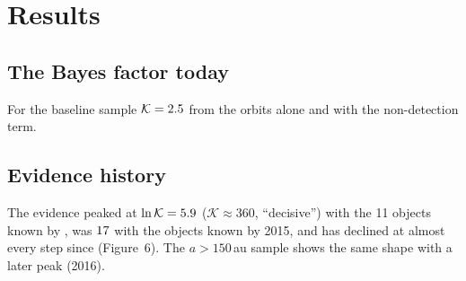 \documentclass[twocolumn,linenumbers]{aastex631}
\newcommand{\Kbf}{\mathcal{K}}
\begin{document}
\section{Results}\label{sec:results}

\subsection{The Bayes factor today}\label{sec:bf}
For the baseline sample $\Kbf=\KbbOrbits$ from the orbits alone and \KbbNondet{} with the non-detection term.

\subsection{Evidence history}\label{sec:history}
The evidence peaked at $\ln\Kbf=\lnKpeak$ ($\Kbf\approx360$, ``decisive'') with the 11 objects known by \YearPeak{}, was $17$ with the objects known by 2015, and has declined at almost every step since (Figure~6). The $a>150$\,au sample shows the same shape with a later peak (2016).
\end{document}
